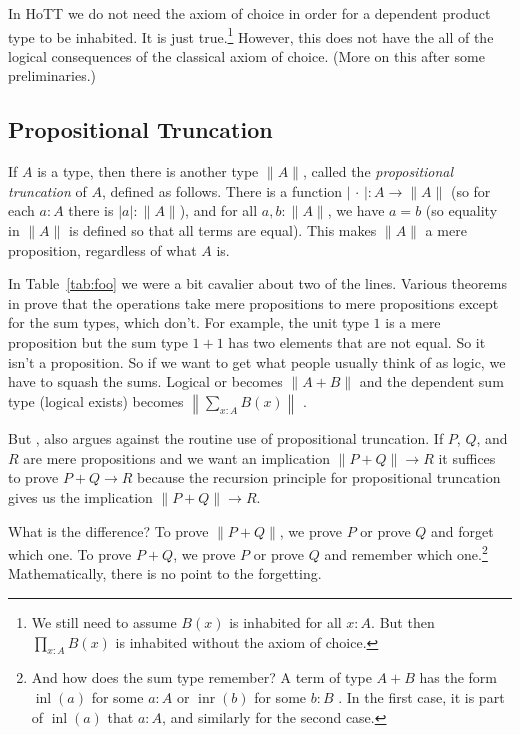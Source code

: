 \documentclass[11pt]{article}
\DeclareMathOperator{\inl}{inl}
\DeclareMathOperator{\inr}{inr}
\newcommand{\proptrunc}[1]{\lVert #1 \rVert}
\newcommand{\termtrunc}[1]{\lvert #1 \rvert}
\newcommand{\bigproptrunc}[1]{\left\lVert #1 \right\rVert}
\newcommand{\fatdot}{\,\cdot\,}
\begin{document}
In HoTT  we do not need the axiom of
choice in order for a dependent product type to be inhabited.
It is just true.\footnote{We still need to assume $B(x)$ is inhabited for
all $x : A$.  But then $\prod_{x : A} B(x)$ is inhabited without the axiom
of choice.}
However, this does not have the all of the logical consequences of the
classical axiom of choice.  (More on this after some preliminaries.)

\subsection{Propositional Truncation}
\label{sec:truncation}

If $A$ is a type, then there is another type $\proptrunc{A}$,
called the \emph{propositional truncation} of $A$, defined
as follows.  There is a function $\termtrunc{\fatdot} : A \to \proptrunc{A}$
(so for each $a : A$ there is $\termtrunc{a} : \proptrunc{A}$),
and for all $a, b : \proptrunc{A}$, we have $a = b$
(so equality in $\proptrunc{A}$ is defined so that all terms are equal).
This makes $\proptrunc{A}$ a mere proposition, regardless of what $A$ is.

In Table~\ref{tab:foo} we were a bit cavalier about two of the lines.
Various theorems in  prove that the operations take
mere propositions to mere propositions except for the sum types, which don't.
For example, the unit type $1$ is a mere proposition
but the sum type $1 + 1$ has two elements that
are not equal.  So it isn't a proposition.
So if we want to get what people usually
think of as logic, we have to squash the sums.  Logical or becomes
$\proptrunc{A + B}$ and the dependent sum type (logical exists) becomes
$\bigproptrunc{\sum_{x : A} B(x)}$
.

But , also argues against the routine
use of propositional truncation.  If $P$, $Q$, and $R$ are mere propositions
and we want an implication $\proptrunc{P + Q} \to R$ it suffices to prove
$P + Q \to R$ because the recursion principle for propositional truncation
gives us the implication $\proptrunc{P + Q} \to R$.

What is the difference?  To prove $\proptrunc{P + Q}$, we prove $P$ or prove
$Q$ and forget which one.  To prove $P + Q$, we prove $P$ or prove
$Q$ and remember which one.\footnote{And how does the sum type remember?
A term of type $A + B$ has the form $\inl(a)$ for some $a : A$
or $\inr(b)$ for some $b : B$ .
In the first case, it is part of $\inl(a)$ that $a : A$, and similarly
for the second case.}
Mathematically, there is no point to the forgetting.
\end{document}
